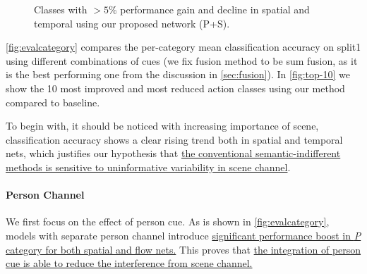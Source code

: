 \begin{figure}
\caption[$ >5\% $ Improvements and Delines]{Classes with $ >5\% $ performance gain and decline in spatial and temporal using our proposed network (P+S).}\label{fig:top-10}
\end{figure}

\autoref{fig:evalcategory} compares the per-category mean classification accuracy on split1 using different combinations of cues (we fix fusion method to be sum fusion, as it is the best performing one from the discussion in \autoref{sec:fusion}).
In \autoref{fig:top-10} we show the 10 most improved and most reduced action classes using our method compared to baseline.

To begin with, it should be noticed with increasing importance of scene, classification accuracy shows a clear rising trend both in spatial and temporal nets, which justifies our hypothesis that \ul{the conventional semantic-indifferent methods is sensitive to uninformative variability in scene channel}. 

\paragraph{Person Channel} We first focus on the effect of person cue.
As is shown in \autoref{fig:evalcategory}, models with separate person channel introduce \ul{significant performance boost in \textit{P} category for both spatial and flow nets.}
This proves that \ul{the integration of person cue is able to reduce the interference from scene channel.}

